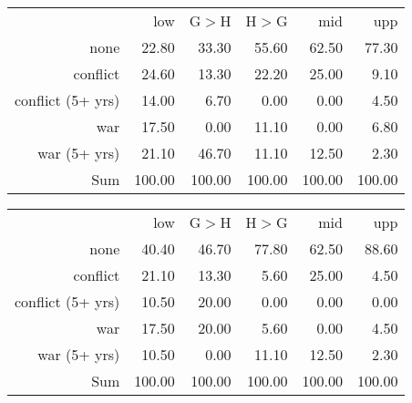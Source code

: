 \begin{table}[ht]
\centering
\begin{tabular}{rrrrrr}
\hline
                  & low    & G$>$H  & H$>$G  & mid    & upp \\
none              & 22.80  & 33.30  & 55.60  & 62.50  & 77.30 \\
conflict          & 24.60  & 13.30  & 22.20  & 25.00  & 9.10 \\
conflict (5+ yrs) & 14.00  & 6.70   & 0.00   & 0.00   & 4.50 \\
war               & 17.50  & 0.00   & 11.10  & 0.00   & 6.80 \\
war (5+ yrs)      & 21.10  & 46.70  & 11.10  & 12.50  & 2.30 \\
Sum               & 100.00 & 100.00 & 100.00 & 100.00 & 100.00 \\
\hline
\end{tabular}
\end{table}

\begin{table}[ht]
\centering
\begin{tabular}{rrrrrr}
\hline
                  & low    & G$>$H  & H$>$G  & mid    & upp \\
none              & 40.40  & 46.70  & 77.80  & 62.50  & 88.60 \\
conflict          & 21.10  & 13.30  & 5.60   & 25.00  & 4.50 \\
conflict (5+ yrs) & 10.50  & 20.00  & 0.00   & 0.00   & 0.00 \\
war               & 17.50  & 20.00  & 5.60   & 0.00   & 4.50 \\
war (5+ yrs)      & 10.50  & 0.00   & 11.10  & 12.50  & 2.30 \\
Sum               & 100.00 & 100.00 & 100.00 & 100.00 & 100.00 \\
\hline
\end{tabular}
\end{table}

